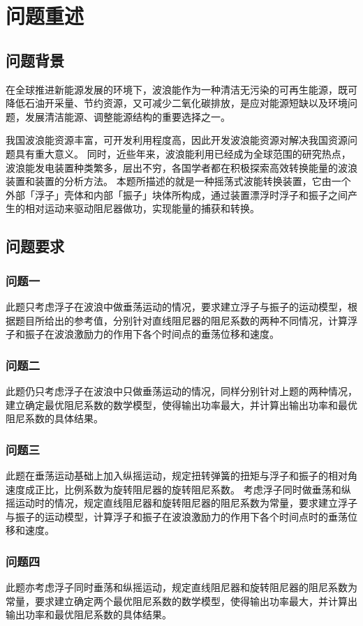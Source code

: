 \section{问题重述}

\subsection{问题背景}
在全球推进新能源发展的环境下，波浪能作为一种清洁无污染的可再生能源，既可降低石油开采量、节约资源，又可减少二氧化碳排放，是应对能源短缺以及环境问题，发展清洁能源、调整能源结构的重要选择之一。

我国波浪能资源丰富，可开发利用程度高，因此开发波浪能资源对解决我国资源问题具有重大意义。
同时，近些年来，波浪能利用已经成为全球范围的研究热点，波浪能发电装置种类繁多，层出不穷，各国学者都在积极探索高效转换能量的波浪装置和装置的分析方法。
本题所描述的就是一种摇荡式波能转换装置，它由一个外部「浮子」壳体和内部「振子」块体所构成，通过装置漂浮时浮子和振子之间产生的相对运动来驱动阻尼器做功，实现能量的捕获和转换。

\subsection{问题要求}

\subsubsection{问题一}

此题只考虑浮子在波浪中做垂荡运动的情况，要求建立浮子与振子的运动模型，根据题目所给出的参考值，分别针对直线阻尼器的阻尼系数的两种不同情况，计算浮子和振子在波浪激励力的作用下各个时间点的垂荡位移和速度。

\subsubsection{问题二}

此题仍只考虑浮子在波浪中只做垂荡运动的情况，同样分别针对上题的两种情况，建立确定最优阻尼系数的数学模型，使得输出功率最大，并计算出输出功率和最优阻尼系数的具体结果。

\subsubsection{问题三}

此题在垂荡运动基础上加入纵摇运动，规定扭转弹簧的扭矩与浮子和振子的相对角速度成正比，比例系数为旋转阻尼器的旋转阻尼系数。
考虑浮子同时做垂荡和纵摇运动时的情况，规定直线阻尼器和旋转阻尼器的阻尼系数为常量，要求建立浮子与振子的运动模型，计算浮子和振子在波浪激励力的作用下各个时间点时的垂荡位移和速度。

\subsubsection{问题四}

此题亦考虑浮子同时垂荡和纵摇运动，规定直线阻尼器和旋转阻尼器的阻尼系数为常量，要求建立确定两个最优阻尼系数的数学模型，使得输出功率最大，并计算出输出功率和最优阻尼系数的具体结果。


